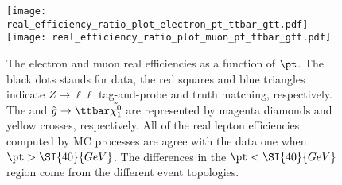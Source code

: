 \begin{figure}[htbp]
\texttt{[image: real\_efficiency\_ratio\_plot\_electron\_pt\_ttbar\_gtt.pdf]}
\texttt{[image: real\_efficiency\_ratio\_plot\_muon\_pt\_ttbar\_gtt.pdf]}
\caption{
The electron and muon real efficiencies as a function of $\pt$.
The black dots stands for data, the red squares and blue triangles indicate $Z\to\ell\ell$ tag-and-probe and truth matching, respectively.
The \ttbar and $\tilde{g}\to\ttbar\tilde{\chi^{0}_{1}}$ are represented by magenta diamonds and yellow crosses, respectively.
All of the real lepton efficiencies computed by MC processes are agree with the data one when $\pt>\SI{40}{GeV}$.
The differences in the $\pt<\SI{40}{GeV}$ region come from the different event topologies. 
}
\label{fig:RLE_real_efficiency_ttbar_gtt}
\end{figure}
